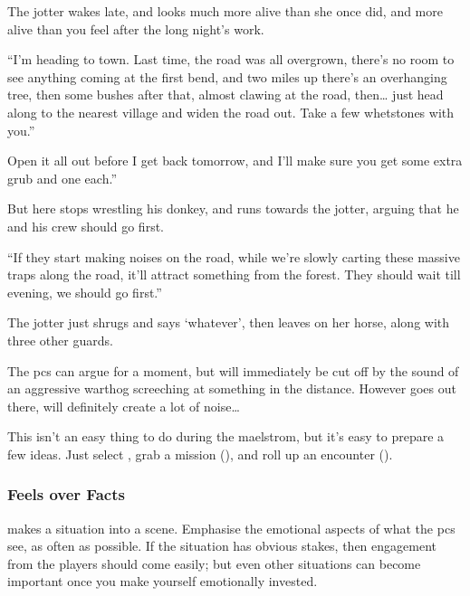 \begin{multicols}{2}
\begin{boxtext}
  The \gls{jotter} wakes late, and looks much more alive than she once did, and more alive than you feel after the long night's work.

  ``I'm heading to town.
  Last time, the road was all overgrown, there's no room to see anything coming at the first bend, and two miles up there's an overhanging tree, then some bushes after that, almost clawing at the road, then\ldots
  just head along to the nearest \gls{village} and widen the road out.
  Take a few whetstones with you.''

  Open it all out before I get back tomorrow, and I'll make sure you get some extra grub and one  each.''

  But here  stops wrestling his donkey, and runs towards the \gls{jotter}, arguing that he and his crew should go first.

  ``If they start making noises on the road, while we're slowly carting these massive traps along the road, it'll attract something from the forest.
  They should wait till evening, we should go first.''

  The \gls{jotter} just shrugs and says `whatever', then leaves on her horse, along with three other \glspl{guard}.
\end{boxtext}

The \glspl{pc} can argue for a moment, but will immediately be cut off by the sound of an aggressive warthog screeching at something in the distance.
However goes out there, will definitely create a lot of noise\ldots

\bigLine

This isn't an easy thing to do during the maelstrom, but it's easy to prepare a few ideas.
Just select , grab a mission (), and roll up an encounter ().

\subsubsection{Feels over Facts}
makes a situation into a scene.
Emphasise the emotional aspects of what the \glspl{pc} see, as often as possible.
If the situation has obvious stakes, then engagement from the players should come easily; but even other situations can become important once you make yourself emotionally invested.


\end{multicols}
